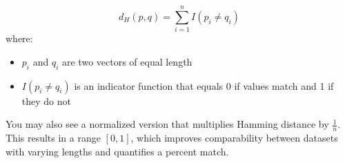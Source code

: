 \documentclass[preview]{standalone}
\begin{document}
{\large
\[
d_H(p,q)=\sum^n_{i=1}I(p_i\neq q_i)
\]
}
where:
\begin{itemize}
	\setlength\itemsep{0.1em}
	\item $p_i$ and $q_i$ are two vectors of equal length
	\item $I(p_i\neq q_i)$ is an indicator function that equals 0 if values match and 1 if they do not
\end{itemize}
You may also see a normalized version that multiplies Hamming distance by $\frac{1}{n}$. This results in a range $[0,1]$, which improves comparability between datasets with varying lengths and quantifies a percent match.
\end{document}

